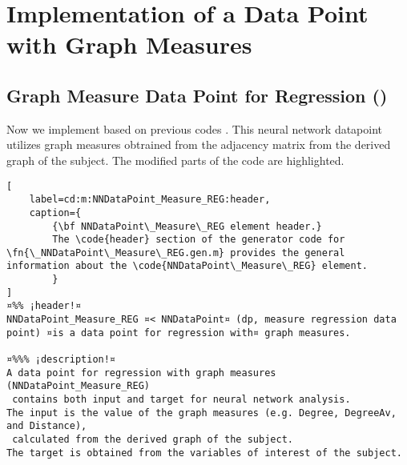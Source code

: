 \documentclass{tufte-handout}
\begin{document}
\clearpage
\section{Implementation of a Data Point with Graph Measures}
\subsection{Graph Measure Data Point for Regression ()}

Now we implement  based on previous codes .
This neural network datapoint utilizes graph measures obtrained from the adjacency matrix from the derived graph of the subject. 
The modified parts of the code are highlighted.

\begin{lstlisting}[
	label=cd:m:NNDataPoint_Measure_REG:header,
	caption={
		{\bf NNDataPoint\_Measure\_REG element header.}
		The \code{header} section of the generator code for \fn{\_NNDataPoint\_Measure\_REG.gen.m} provides the general information about the \code{NNDataPoint\_Measure\_REG} element.
		}
]
¤%% ¡header!¤
NNDataPoint_Measure_REG ¤< NNDataPoint¤ (dp, measure regression data point) ¤is a data point for regression with¤ graph measures.

¤%%% ¡description!¤
A data point for regression with graph measures (NNDataPoint_Measure_REG) 
 contains both input and target for neural network analysis.
The input is the value of the graph measures (e.g. Degree, DegreeAv, and Distance), 
 calculated from the derived graph of the subject.
The target is obtained from the variables of interest of the subject.
\end{lstlisting}
\end{document}
